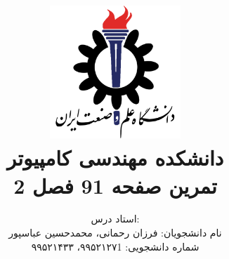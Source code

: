 \title{
    \center
    \includegraphics[width=5cm, height=5cm]{images/IUST_logo_color.png} \\
    دانشکده مهندسی کامپیوتر \\[25pt]     
تمرین صفحه 91 فصل 2 \\
\CourseName 
}
\author{
    استاد درس:
    \Instructor \\
    نام دانشجویان:
    فرزان رحمانی، محمدحسین عباسپور\\
    شماره دانشجویی: ۹۹۵۲۱۲۷1، ۹۹۵۲۱۴۳۳
    \\ %
}
\date{\Semester}